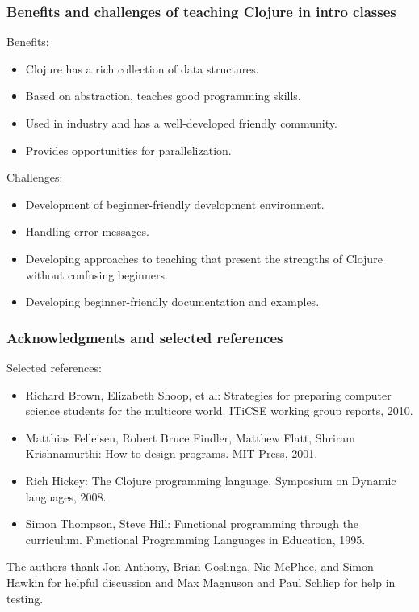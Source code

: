 \documentclass{beamer}
\newcommand{\allcomments}[1]{{#1}}
\newcommand{\joecomment}[1]{{\bf \color{JoesGold}{\allcomments{{#1}}}}}
\begin{document}
\begin{frame}
\frametitle{Benefits and challenges of teaching Clojure in intro classes}
Benefits:
\begin{itemize}
\item Clojure has a rich collection of data structures.
\item Based on abstraction, teaches good programming skills. 
\item Used in industry and has a well-developed friendly community. 
\item Provides opportunities for parallelization. 
\end{itemize}
Challenges:
\begin{itemize}
\item Development of beginner-friendly development environment. 
\item Handling error messages.
\item Developing approaches to teaching that present the strengths of Clojure without confusing beginners. 
\item Developing beginner-friendly documentation and examples. 
\end{itemize}%
\end{frame}

\begin{frame}
\frametitle{Acknowledgments and selected references}
Selected references:
\begin{itemize}
\item Richard Brown, Elizabeth Shoop, et al: Strategies for preparing computer science students for the multicore world.  ITiCSE working group reports, 2010.
\item Matthias Felleisen, Robert Bruce Findler, Matthew Flatt, Shriram Krishnamurthi: How to design
programs. MIT Press, 2001.
\item Rich Hickey: The Clojure programming language. Symposium on
Dynamic languages, 2008. 
\item Simon Thompson, Steve Hill: Functional programming through the curriculum. Functional
Programming Languages in Education, 1995. 
\end{itemize}
The authors thank Jon Anthony, Brian Goslinga, Nic McPhee, and Simon Hawkin for helpful discussion and Max Magnuson and Paul Schliep for help in testing. 
\end{frame}
\end{document}
